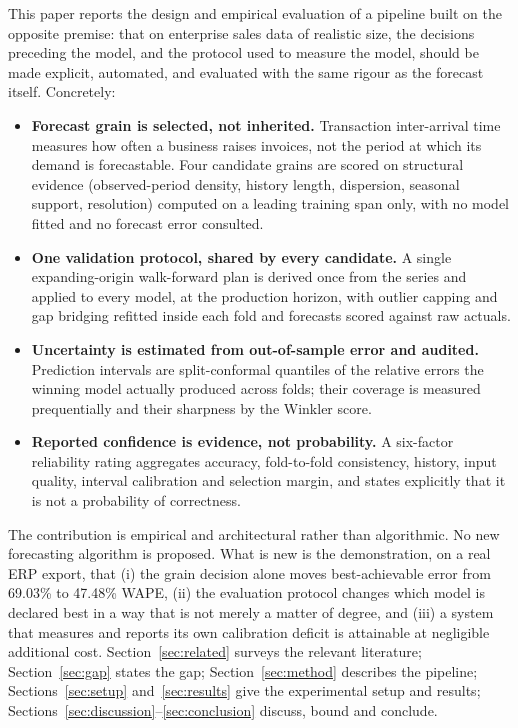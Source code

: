 \documentclass[conference]{IEEEtran}
\begin{document}
This paper reports the design and empirical evaluation of a pipeline built on
the opposite premise: that on enterprise sales data of realistic size, the
decisions preceding the model, and the protocol used to measure the model,
should be made explicit, automated, and evaluated with the same rigour as the
forecast itself. Concretely:

\begin{itemize}
\item \textbf{Forecast grain is selected, not inherited.} Transaction
      inter-arrival time measures how often a business raises invoices, not
      the period at which its demand is forecastable. Four candidate grains
      are scored on structural evidence (observed-period density, history
      length, dispersion, seasonal support, resolution) computed on a leading
      training span only, with no model fitted and no forecast error consulted.
\item \textbf{One validation protocol, shared by every candidate.} A single
      expanding-origin walk-forward plan is derived once from the series and
      applied to every model, at the production horizon, with outlier capping
      and gap bridging refitted inside each fold and forecasts scored against
      raw actuals.
\item \textbf{Uncertainty is estimated from out-of-sample error and audited.}
      Prediction intervals are split-conformal quantiles of the relative
      errors the winning model actually produced across folds; their coverage
      is measured prequentially and their sharpness by the Winkler score.
\item \textbf{Reported confidence is evidence, not probability.} A six-factor
      reliability rating aggregates accuracy, fold-to-fold consistency,
      history, input quality, interval calibration and selection margin, and
      states explicitly that it is not a probability of correctness.
\end{itemize}

The contribution is empirical and architectural rather than algorithmic. No
new forecasting algorithm is proposed. What is new is the demonstration, on a
real ERP export, that (i) the grain decision alone moves best-achievable
error from 69.03\% to 47.48\% WAPE, (ii) the evaluation protocol changes which
model is declared best in a way that is not merely a matter of degree, and
(iii) a system that measures and reports its own calibration deficit is
attainable at negligible additional cost. Section~\ref{sec:related} surveys the
relevant literature; Section~\ref{sec:gap} states the gap;
Section~\ref{sec:method} describes the pipeline; Sections~\ref{sec:setup}
and~\ref{sec:results} give the experimental setup and results;
Sections~\ref{sec:discussion}--\ref{sec:conclusion} discuss, bound and
conclude.
\end{document}
